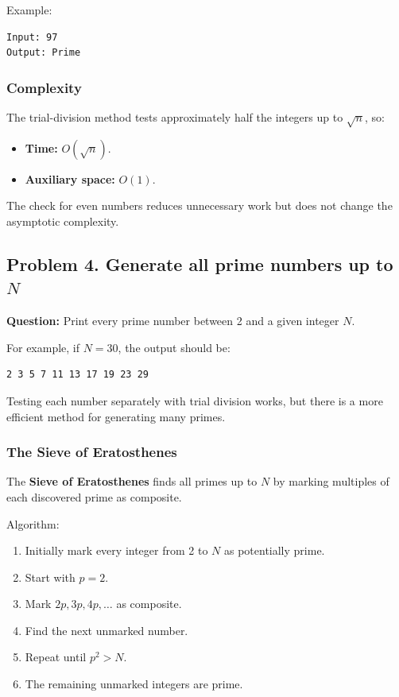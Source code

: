Example:

\begin{lstlisting}[style=pseudocode]
Input: 97
Output: Prime
\end{lstlisting}

\subsubsection{Complexity}

The trial-division method tests approximately half the integers up to $\sqrt n$, so:

\begin{itemize}
    \item \textbf{Time:} $O(\sqrt n)$.
    \item \textbf{Auxiliary space:} $O(1)$.
\end{itemize}

The check for even numbers reduces unnecessary work but does not change the asymptotic complexity.

\subsection{\textbf{Problem 4. Generate all prime numbers up to }$N$}

\textbf{Question:} Print every prime number between 2 and a given integer $N$.

For example, if $N=30$, the output should be:

\begin{lstlisting}[style=pseudocode]
2 3 5 7 11 13 17 19 23 29
\end{lstlisting}

Testing each number separately with trial division works, but there is a more efficient method for generating many primes.

\subsubsection{The Sieve of Eratosthenes}

The \textbf{Sieve of Eratosthenes} finds all primes up to $N$ by marking multiples of each discovered prime as composite.

Algorithm:

\begin{enumerate}
    \item Initially mark every integer from 2 to $N$ as potentially prime.
    \item Start with $p=2$.
    \item Mark $2p,3p,4p,\ldots$ as composite.
    \item Find the next unmarked number.
    \item Repeat until $p^2>N$.
    \item The remaining unmarked integers are prime.
\end{enumerate}

